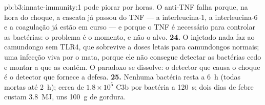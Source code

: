 \begin{solution}{pb:b3:innate-immunity:1}
 pode piorar por horas. O anti-TNF falha porque, na hora do
choque, a cascata já passou do TNF --- a interleucina-1, a
interleucina-6 e a coagulação já estão em curso --- e porque o TNF é
necessário para controlar as bactérias: o problema é o momento, e não
o alvo.
\textbf{24.} O  injetado nada faz ao camundongo sem
TLR4, que sobrevive a doses letais para camundongos normais; uma
infecção viva por  o mata, porque ele não consegue
detectar as bactérias cedo e montar a  que as contém. O
paradoxo se dissolve: o detector que causa o choque é o detector que
fornece a defesa.
\textbf{25.} Nenhuma bactéria resta a \qty{6}{h} (todas mortas até
\qty{2}{h}); cerca de $1.8\times 10^{5}$ C3b por bactéria a
\qty{120}{s}; dois dias de febre custam \qty{3.8}{MJ}, uns
\qty{100}{g} de gordura.
\end{solution}
